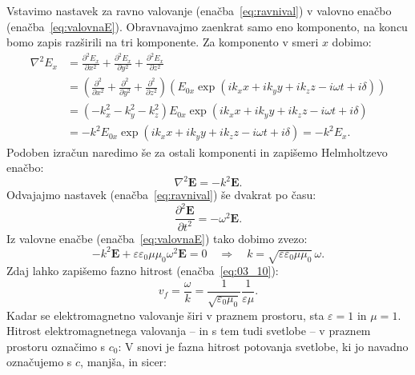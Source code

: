 Vstavimo nastavek za ravno valovanje (enačba~\ref{eq:ravnival}) v valovno enačbo (enačba~\ref{eq:valovnaE}). 
Obravnavajmo zaenkrat samo eno komponento, na koncu bomo zapis razširili na tri komponente. 
Za komponento v smeri $x$ dobimo:
\begin{align}
\nabla^2E_x &= \frac{\partial^2E_x}{\partial x^2} + \frac{\partial^2E_x}{\partial y^2} + 
\frac{\partial^2E_x}{\partial z^2} \nonumber \\
&= \left(\frac{\partial^2}{\partial x^2} + 
\frac{\partial^2}{\partial y^2} + \frac{\partial^2}{\partial z^2}\right) \left(
E_{0x} \exp\left( ik_xx+ik_yy+ik_zz -i\omega t + i\delta\right) \right)\nonumber \\
&= \left( -k_x^2 -k_y^2-k_z^2\right) E_{0x} \exp\left( ik_xx+ik_yy+ik_zz -i\omega t + i\delta\right)\nonumber \\
&= -k^2 E_{0x} \exp\left( ik_xx+ik_yy+ik_zz -i\omega t + i\delta\right) = -k^2 E_x.
\label{eq:03_11}
\end{align}
Podoben izračun naredimo še za ostali komponenti in zapišemo Helmholtzevo enačbo:
\begin{equation}
\nabla^2\mathbf{E}= -k^2 \mathbf{E}.
\label{eq:03_12}
\end{equation}
Odvajajmo nastavek (enačba~\ref{eq:ravnival}) še dvakrat po času:
\begin{equation}
\frac{\partial^2 \mathbf{E}}{\partial t^2} = - \omega^2 \mathbf{E}.
\label{eq:03_13}
\end{equation}
Iz valovne enačbe (enačba~\ref{eq:valovnaE}) tako dobimo zvezo:
\begin{equation}
-k^2 \mathbf{E} + \varepsilon\varepsilon_0\mu\mu_0 \omega^2 \mathbf{E} = 0
\quad \Longrightarrow \quad
k = \sqrt{\varepsilon\varepsilon_0\mu\mu_0}\,\omega.
\label{eq:03_15}
\end{equation}
Zdaj lahko zapišemo fazno hitrost (enačba~\ref{eq:03_10}):
\begin{equation}
v_f = \frac{\omega}{k} = \frac{1}{\sqrt{\varepsilon_0\mu_0}}\frac{1}{\varepsilon\mu}.
\label{eq:fazna}
\end{equation}
Kadar se elektromagnetno valovanje širi v praznem prostoru, sta $\varepsilon = 1$ in $\mu=1$. 
Hitrost elektromagnetnega valovanja -- in s tem tudi svetlobe --
v praznem prostoru označimo s $c_0$:
V snovi je fazna hitrost potovanja svetlobe,
ki jo navadno označujemo s $c$, manjša, in sicer:
